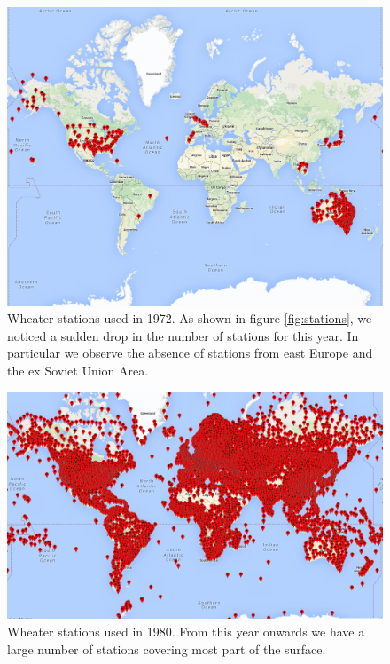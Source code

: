 \documentclass{vldb}
\begin{document}
\begin{figure}[tbh]
\includegraphics[width=1\linewidth]{stations1972}
\caption{Wheater stations used in 1972. As shown in figure \ref{fig:stations}, we noticed a sudden drop in the number of stations for this year. In particular we observe the absence of stations from east Europe and the ex Soviet Union Area.}
\label{fig:stations1972}
\end{figure}
\begin{figure}[tbh]
\includegraphics[width=1\linewidth]{stations1980}
\caption{Wheater stations used in 1980. From this year onwards we have a large number of stations covering most part of the surface.}
\label{fig:stations1980}
\end{figure}
\end{document}

